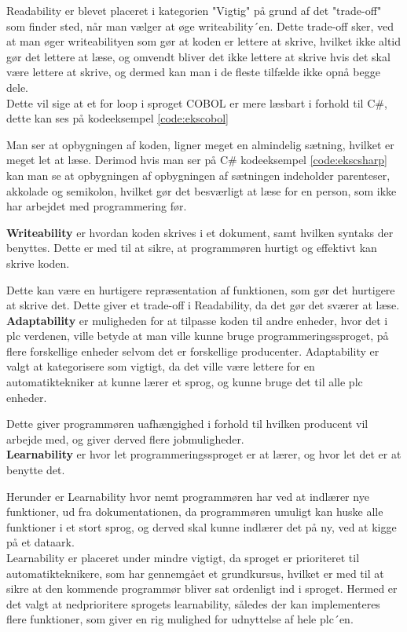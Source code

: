 Readability er blevet placeret i kategorien "Vigtig" på grund af det "trade-off" som finder sted, når man vælger at øge writeability´en.
Dette trade-off sker, ved at man øger writeabilityen som gør at koden er lettere at skrive, hvilket ikke altid gør det lettere at læse, og omvendt bliver det ikke lettere at skrive hvis det skal være lettere at skrive, og dermed kan man i de fleste tilfælde ikke opnå begge dele.
\\
Dette vil sige at et for loop i sproget COBOL er mere læsbart i forhold til C\#, dette kan ses på kodeeksempel \ref{code:ekscobol}


\noindent Man ser at opbygningen af koden, ligner meget en almindelig sætning, hvilket er meget let at læse. Derimod hvis man ser på C\# kodeeksempel \ref{code:ekscsharp} kan man se at opbygningen af opbygningen af sætningen indeholder parenteser, akkolade og semikolon, hvilket gør det besværligt at læse for en person, som ikke har arbejdet med programmering før.



\noindent\textbf{Writeability} er hvordan koden skrives i et dokument, samt hvilken syntaks der benyttes. Dette er med til at sikre, at programmøren hurtigt og effektivt kan skrive koden.

Dette kan være en hurtigere repræsentation af funktionen, som gør det hurtigere at skrive det. Dette giver et trade-off i Readability, da det gør det sværer at læse.\\

\noindent\textbf{Adaptability} er muligheden for at tilpasse koden til andre enheder, hvor det i \gls{plc} verdenen, ville betyde at man ville kunne bruge programmeringssproget, på flere forskellige enheder selvom det er forskellige producenter. Adaptability er valgt at kategorisere som vigtigt, da det ville være lettere for en automatiktekniker at kunne lærer et sprog, og kunne bruge det til alle \gls{plc} enheder.

Dette giver programmøren uafhængighed i forhold til hvilken producent vil arbejde med, og giver derved flere jobmuligheder.\\

\noindent\textbf{Learnability} er hvor let programmeringssproget er at lærer, og hvor let det er at benytte det.

Herunder er Learnability hvor nemt programmøren har ved at indlærer nye funktioner, ud fra dokumentationen, da programmøren umuligt kan huske alle funktioner i et stort sprog, og derved skal kunne indlærer det på ny, ved at kigge på et dataark. \\
Learnability er placeret under mindre vigtigt, da sproget er prioriteret til automatikteknikere, som har gennemgået et grundkursus, hvilket er med til at sikre at den kommende programmør bliver sat ordenligt ind i sproget. Hermed er det valgt at nedprioritere sprogets learnability, således der kan implementeres flere funktioner, som giver en rig mulighed for udnyttelse af hele \gls{plc}´en.\\

